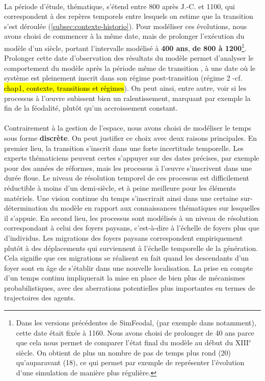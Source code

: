 \paragraph[Durée]{} La période d'étude, thématique, s'étend entre 800 après J.-C. et 1100, qui correspondent à des repères temporels entre lesquels on estime que la transition s'est déroulée (\cref{subsec:contexte-historio}).
Pour modéliser ces évolutions, nous avons choisi de commencer à la même date, mais de prolonger l'exécution du modèle d'un siècle, portant l'intervalle modélisé à \textbf{400 ans}, \textbf{de 800 à 1200}\footnote{
	Dans les versions précédentes de SimFeodal, (par exemple dans \textcite{cura_transition_2017} notamment), cette date était fixée à 1160.
	Nous avons choisi de prolonger de 40 ans parce que cela nous permet de comparer l'état final du modèle au début du XIII$^e$ siècle.
	On obtient de plus un nombre de pas de temps plus \og rond\fg{} (20) qu'auparavant (18), ce qui permet par exemple de représenter l'évolution d'une simulation de manière plus régulière.
}.
Prolonger cette date d'observation des résultats du modèle permet d'analyser le comportement du modèle après la période même de transition , à une date où le système est pleinement inscrit dans son régime post-transition (régime 2 -cf. \hl{chap1, contexte, transitions et régimes}).
On peut ainsi, entre autre, voir si les processus à l'œuvre subissent bien un ralentissement, marquant par exemple la fin de la féodalité, plutôt qu'un accroissement constant.

\paragraph[Discret]{} Contrairement à la gestion de l'espace, nous avons choisi de modéliser le temps sous forme \textbf{discrète}.
On peut justifier ce choix avec deux raisons principales.
En premier lieu, la transition s'inscrit dans une forte incertitude temporelle. 
Les experts thématiciens peuvent certes s'appuyer sur des dates précises, par exemple pour des années de réformes, mais les processus à l'œuvre s'inscrivent dans une durée floue.
Le niveau de résolution temporel de ces processus est difficilement réductible à moins d'un demi-siècle, et à peine meilleure pour les éléments matériels.
Une vision continue du temps s'inscrirait ainsi dans une certaine sur-détermination du modèle en rapport aux connaissances thématiques sur lesquelles il s'appuie.
En second lieu, les processus sont modélisés à un niveau de résolution correspondant à celui des \og foyers paysans\fg{}, c'est-à-dire à l'échelle de foyers plus que d'individus.
Les migrations des foyers paysans correspondent empiriquement plutôt à des déplacements qui surviennent à l'échelle temporelle de la génération.
Cela signifie que ces migrations se réalisent en fait quand les descendants d'un foyer sont en âge de s'établir dans une nouvelle localisation.
La prise en compte d'un temps continu impliquerait la mise en place de bien plus de mécanismes probabilistiques, avec des aberrations potentielles plus importantes en termes de trajectoires des agents.

